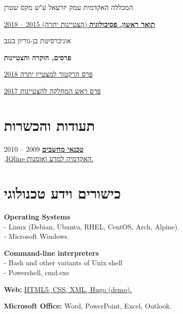 \documentclass[
	12pt,a4paper %
]{article}
\begin{document}
\begin{hebrew}
	\noindent המכללה האקדמית עמק יזרעאל ע"ש מקס שטרן

	\noindent\dotfill %

	\noindent\href{https://loona-il.000webhostapp.com/resume-references/BA-and-honorary.pdf}{\large \noindent\textbf{תואר ראשון, פסיכולוגיה} \normalsize{(הצטיינות יתרה)} \hfill 2015 -- 2018}

	\noindent אוניברסיטת בן-גוריון בנגב

	\noindent\textbf{פרסים, הוקרה והצטיינות}

	\href{https://loona-il.000webhostapp.com/resume-references/BA-and-honorary.pdf}{פרס הרקטור למצטיין יתרה \hfill 2018}

	\href{https://loona-il.000webhostapp.com/resume-references/BA-and-honorary.pdf}{פרס ראש המחלקה להצטיינות \hfill 2017}

	\begin{paracol}{2} %
		\section{תעודות והכשרות}

		\href{https://loona-il.000webhostapp.com/resume-references/computer-technitian-certificate.jpg}{\textbf{טכנאי מחשבים}} \hfill 2009 -- 2010 \\
		\href{https://loona-il.000webhostapp.com/resume-references/computer-technitian-certificate.jpg}{,IQline האקדמיה למדע ואומנות.}

		\section{כישורים וידע טכנולוגי}

		\unsetRTL
		\setLTR

\textbf{Operating Systems} \\
- Linux (Debian, Ubuntu, RHEL, CentOS, Arch, Alpine).\\
- Microsoft Windows.

\textbf{Command-line interpreters} \\
- Bash and other variants of Unix shell \\
- Powershell, cmd.exe

\textbf{Web:} \href{https://kirilu.netlify.app/resume/}{HTML5, CSS, XML, Hugo (demo).}

\textbf{Microsoft Office:} Word, PowerPoint, Excel, Outlook.


\end{paracol}
\end{hebrew}
\end{document}
